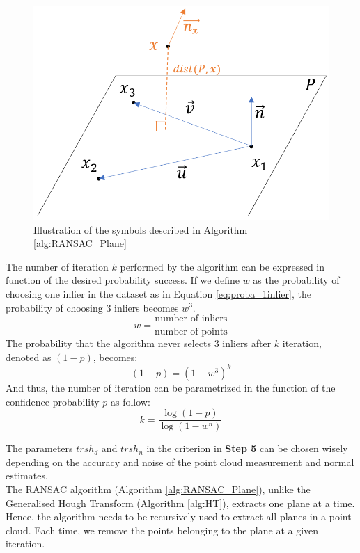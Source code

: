 \begin{figure}[ht]
    \centering
    \includegraphics[scale=0.4]{Img/03_RANSAC.png}
    \caption{Illustration of the symbols described in Algorithm \ref{alg:RANSAC_Plane}}
    \label{fig:ght_illustration}
\end{figure}
The number of iteration $k$ performed by the algorithm can be expressed in function of the desired probability success. If we define $w$ as the probability of choosing one inlier in the dataset as in Equation \ref{eq:proba_1inlier}, the probability of choosing 3 inliers becomes $w^3$.
\begin{equation}\label{eq:proba_1inlier}
    w = \frac{\text{number of inliers}}{\text{number of points}}
\end{equation}
 The probability that the algorithm never selects 3 inliers after $k$ iteration, denoted as $(1-p)$, becomes:
 \begin{equation}
     (1-p) = (1-w^3)^k
 \end{equation}
 And thus, the number of iteration can be parametrized in the function of the confidence probability $p$ as follow:
 \begin{equation}
     k = \frac{\log (1-p)}{\log (1- w^n)}
 \end{equation}

The parameters $trsh_d$ and $trsh_n$ in the criterion in \textbf{Step 5} can be chosen wisely depending on the accuracy and noise of the point cloud measurement and normal estimates.\\

The RANSAC algorithm (Algorithm \ref{alg:RANSAC_Plane}), unlike the Generalised Hough Transform (Algorithm \ref{alg:HT}), extracts one plane at a time. Hence, the algorithm needs to be recursively used to extract all planes in a point cloud. Each time, we remove the points belonging to the plane at a given iteration.
